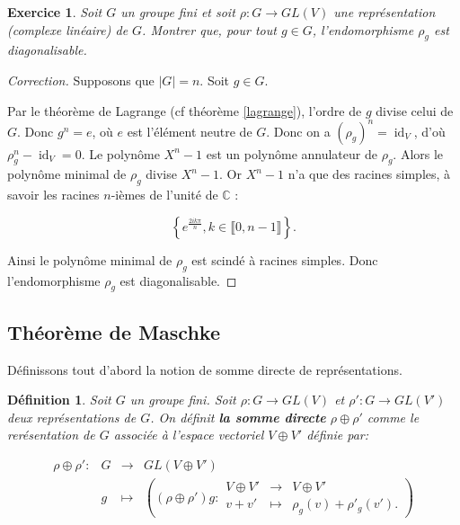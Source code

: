 \documentclass[french]{article}
\newtheorem{protodefinition}{Définition}[section]
\newenvironment{definition}
    {\colorlet{shadecolor}{green!5}\begin{shaded}\begin{protodefinition}}
    {\end{protodefinition}\end{shaded}}
\newtheorem{exo}{Exercice}
\begin{document}
\begin{exo}
  Soit \(G\) un groupe fini et soit \(\rho : G \longrightarrow GL(V)\) une représentation (complexe linéaire) de \(G\). Montrer que, pour tout \(g \in G\), l'endomorphisme \(\rho_g\) est diagonalisable.
\end{exo}

\begin{proof}[Correction]
  Supposons que \(\lvert G \rvert = n\). Soit \(g \in G\).

  Par le théorème de Lagrange (cf théorème \ref{lagrange}), l'ordre de \(g\) divise celui de \(G\). Donc \(g^{n} = e\), où \(e\) est l'élément neutre de \(G\). Donc on a \((\rho_g)^{n} = \operatorname{id}_V\), d'où \(\rho_g^{n}-\operatorname{id}_V = 0\). Le polynôme \(X^{n}-1 \) est un polynôme annulateur de \(\rho_g\). Alors le polynôme minimal de \(\rho_g\) divise \(X^{n}-1\). Or \(X ^{n}-1\) n'a que des racines simples, à savoir les racines \(n\)-ièmes de l'unité de \(\mathbb{C}\) :

  \[\left\{ e^{\frac{2 i k \pi}{n}}, k \in \llbracket 0, n-1 \rrbracket \right\}.\]  %

  Ainsi le polynôme minimal de \(\rho_g\) est scindé à racines simples. Donc l'endomorphisme \(\rho_g\) est diagonalisable.
\end{proof}

\subsection{Théorème de Maschke}

Définissons tout d'abord la notion de somme directe de représentations.

\begin{definition}
  Soit \(G\) un groupe fini. Soit \(\rho : G \to GL(V)\) et \(\rho' : G \to GL(V')\) deux représentations de \(G\). On définit \textbf{la somme directe} \(\rho\oplus \rho'\) comme le rerésentation de \(G\) associée à l'espace vectoriel \(V \oplus V'\) définie par:

  \begin{equation}
    \begin{matrix}
    \rho \oplus \rho' : & G & \longrightarrow & GL(V\oplus V') \\
    \ & g & \longmapsto & \left((\rho \oplus \rho')g : \begin{matrix}
      V \oplus V' & \longrightarrow & V \oplus V' \\
      v + v' & \longmapsto & \rho_g(v) + \rho'_g(v').
    \end{matrix}\right)
    \end{matrix}
  \end{equation}
\end{definition}
\end{document}

